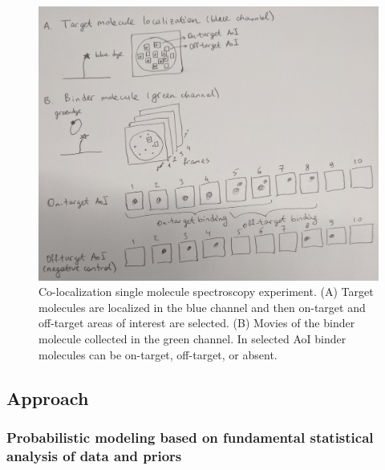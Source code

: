 \begin{figure}
\includegraphics[width=\linewidth]{figures/figure1.jpg}
\caption{Co-localization single molecule spectroscopy experiment. (A) Target molecules are localized in the blue channel and then on-target and off-target areas of interest are selected. (B) Movies of the binder molecule collected in the green channel. In selected AoI binder molecules can be on-target, off-target, or absent.}
\label{fig:cosmos_experiment}
\end{figure}

\subsection{Approach}

\subsubsection{Probabilistic modeling based on fundamental statistical analysis of data and priors}

